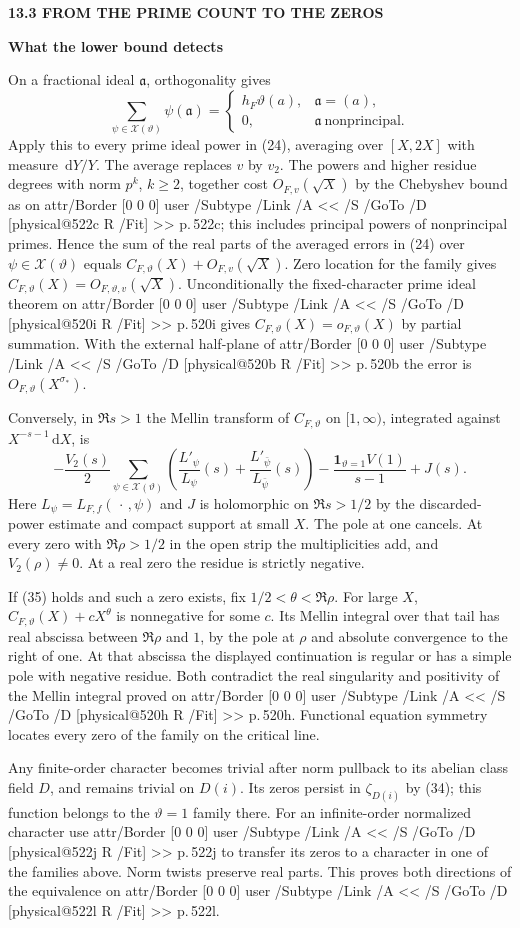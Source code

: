 \documentclass[11pt,letterpaper]{article}
\makeatletter
\newcommand{\rightmarktext}{}
\newcommand{\printfolio}{}
\newcommand{\leaf}[4]{\clearpage\gdef\printfolio{#1}\gdef\rightmarktext{#2}%
  {\small\sffamily\bfseries\color{ink}#3\par}\vspace{3pt}%
  {\LARGE\bfseries #4\par}\vspace{5pt}}
\newcommand{\dd}{\,\mathrm d}
\newcommand{\MusicPDFPageRef}[1]{\pdfpageref\csname physical@#1\endcsname\space\space 0 R}
\newcommand{\pagelink}[2]{\leavevmode\pdfstartlink attr{/Border [0 0 0]} user{%
  /Subtype /Link /A << /S /GoTo /D [\MusicPDFPageRef{#1} /Fit] >>}%
  {\color{ink}#2}\pdfendlink}
\newcommand{\pg}[1]{\pagelink{#1}{p.\,#1}}
\makeatother
\begin{document}
\leaf{522m}{Principal prime ideals}{13.3 \quad FROM THE PRIME COUNT TO THE ZEROS}{What the lower bound detects}
On a fractional ideal $\mathfrak a$, orthogonality gives
\[
  \sum_{\psi\in\mathcal X(\vartheta)}\psi(\mathfrak a)
  =\begin{cases}h_F\vartheta(a),&\mathfrak a=(a),\\
                  0,&\mathfrak a\ \text{nonprincipal}.
    \end{cases}
\]
Apply this to every prime ideal power in (24), averaging over $[X,2X]$
with measure $\dd Y/Y$. The average replaces $v$ by $v_2$. The powers
and higher residue degrees with norm $p^k$, $k\ge2$, together cost
$O_{F,v}(\sqrt X)$ by the Chebyshev bound as on \pg{522c};
this includes principal powers of nonprincipal primes. Hence the sum
of the real parts of the averaged errors in (24) over
$\psi\in\mathcal X(\vartheta)$ equals $C_{F,\vartheta}(X)+O_{F,v}(\sqrt X)$.
Zero location for the family gives $C_{F,\vartheta}(X)=O_{F,\vartheta,v}(\sqrt X)$.
Unconditionally the fixed-character prime ideal theorem on \pg{520i}
gives $C_{F,\vartheta}(X)=o_{F,\vartheta}(X)$ by partial summation.
With the external half-plane of \pg{520b} the error is $O_{F,\vartheta}(X^{\sigma_*})$.

Conversely, in $\Re s>1$ the Mellin transform of $C_{F,\vartheta}$
on $[1,\infty)$, integrated against $X^{-s-1}\dd X$, is
\[
 -\frac{V_2(s)}2\sum_{\psi\in\mathcal X(\vartheta)}
 \left(\frac{L'_\psi}{L_\psi}(s)+
       \frac{L'_{\bar\psi}}{L_{\bar\psi}}(s)\right)
 -\frac{\mathbf1_{\vartheta=1}V(1)}{s-1}+J(s).
\]
Here $L_\psi=L_{F,f}(\,\cdot\,,\psi)$ and $J$ is holomorphic on
$\Re s>1/2$ by the discarded-power estimate and compact support at
small $X$. The pole at one cancels. At every zero with $\Re\rho>1/2$
in the open strip the multiplicities add, and $V_2(\rho)\ne0$. At a
real zero the residue is strictly negative.

If (35) holds and such a zero exists, fix $1/2<\theta<\Re\rho$.
For large $X$, $C_{F,\vartheta}(X)+cX^\theta$ is nonnegative for
some $c$. Its Mellin integral over that tail has real abscissa between
$\Re\rho$ and $1$, by the pole at $\rho$ and absolute convergence to
the right of one. At that abscissa the displayed continuation is
regular or has a simple pole with negative residue. Both contradict
the real singularity and positivity of the Mellin integral proved on
\pg{520h}. Functional equation symmetry locates every zero of the
family on the critical line.

Any finite-order character becomes trivial after norm pullback to its
abelian class field $D$, and remains trivial on $D(i)$. Its zeros
persist in $\zeta_{D(i)}$ by (34); this function belongs to the
$\vartheta=1$ family there. For an infinite-order normalized character
use \pg{522j} to transfer its zeros to a character in one of the
families above. Norm twists preserve real parts. This proves both
directions of the equivalence on \pg{522l}.
\end{document}
